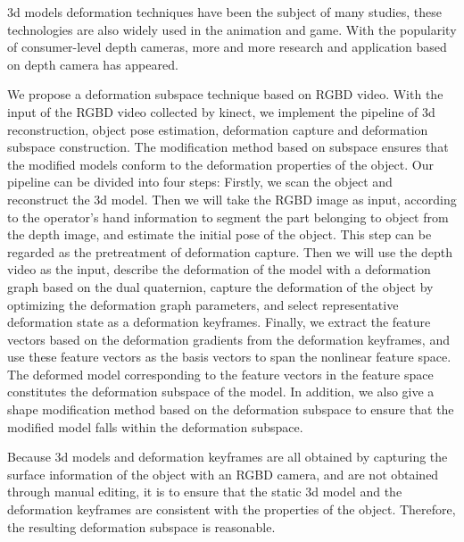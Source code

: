 \begin{englishabstract}

3d models deformation techniques have been the subject of many studies,
these technologies are also widely used in the animation and game.
With the popularity of consumer-level depth cameras, 
more and more research and application based on depth camera has appeared.

We propose a deformation subspace technique based on RGBD video.
With the input of the RGBD video collected by kinect, 
we implement the pipeline of 3d reconstruction,
 object pose estimation, deformation capture and deformation subspace construction.
 The modification method based on subspace ensures that the modified models conform to the deformation properties of the object.
 Our pipeline can be divided into four steps:
 Firstly, we scan the object and reconstruct the 3d model.
 Then we will take the RGBD image as input, 
 according to the operator's hand information to segment the part belonging to object from the depth image, 
 and estimate the initial pose of the object.
 This step can be regarded as the pretreatment of deformation capture.
 Then we will use the depth video as the input, 
 describe the deformation of the model with a deformation graph based on the dual quaternion, 
 capture the deformation of the object by optimizing the deformation graph parameters, 
 and select representative deformation state as a deformation keyframes.
 Finally, we extract the feature vectors based on the deformation gradients from the deformation keyframes, 
 and use these feature vectors as the basis vectors to span the nonlinear feature space. 
 The deformed model corresponding to the feature vectors in the feature space constitutes the deformation subspace of the model.
 In addition, 
 we also give a shape modification method based on the deformation subspace to ensure that the modified model falls within the deformation subspace.

 Because 3d models and deformation keyframes are all obtained by capturing the surface information of the object with an RGBD camera, 
 and are not obtained through manual editing, 
 it is to ensure that the static 3d model and the deformation keyframes are consistent with the properties of the object. 
 Therefore, the resulting deformation subspace is reasonable.


\end{englishabstract}
